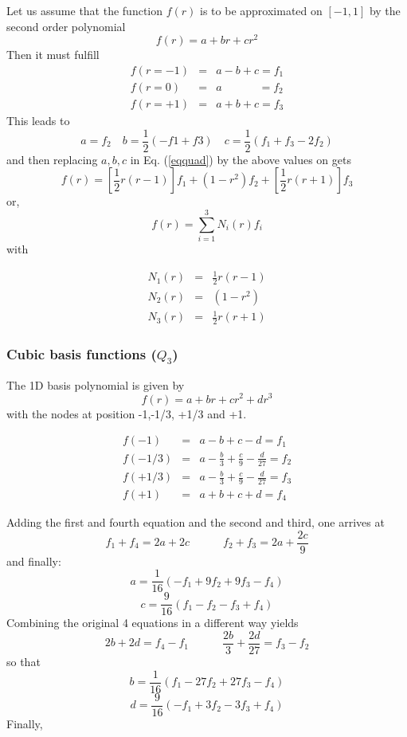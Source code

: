Let us assume that the function $f(r)$ is to be approximated on $[-1,1]$ by the second order polynomial
\begin{equation}
f(r)=a+br+cr^2 \label{eqquad}
\end{equation}
Then it must fulfill
\begin{eqnarray}
f(r=-1)&=&a-b+c = f_1 \nonumber\\
f(r=0) &=&a\quad\quad\quad\;     = f_2 \nonumber\\
f(r=+1)&=&a+b+c = f_3 \nonumber
\end{eqnarray}
This leads to
\[
a=f_2 
\quad
b=\frac{1}{2}(-f1+f3)
\quad
c=\frac{1}{2}(f_1+f_3-2f_2)
\]
and then replacing $a,b,c$ in Eq. (\ref{eqquad}) by the above values on gets
\[
f(r)=\left[\frac{1}{2}r(r-1)\right] f_1 + (1-r^2) f_2 + \left[\frac{1}{2}r(r+1)\right] f_3
\]
or,
\[
f(r) = \sum_{i=1}^3 N_i(r) f_i
\]
with
\begin{mdframed}[backgroundcolor=blue!5]
\begin{eqnarray}
N_1(r) &=& \frac{1}{2}r(r-1) \nonumber\\
N_2(r) &=& (1-r^2) \nonumber\\ 
N_3(r) &=& \frac{1}{2}r(r+1) 
\end{eqnarray}
\end{mdframed}



\subsubsection{Cubic basis functions ($Q_3$)}

The 1D basis polynomial is given by
\[
f(r)=a+br+cr^2+dr^3
\]
with the nodes at position -1,-1/3, +1/3 and +1.

\begin{eqnarray}
f(-1)   &=& a-b+c-d = f_1 \nonumber\\
f(-1/3) &=& a-\frac{b}{3}+\frac{c}{9}-\frac{d}{27} = f_2 \nonumber\\
f(+1/3) &=& a-\frac{b}{3}+\frac{c}{9}-\frac{d}{27} = f_3 \nonumber\\
f(+1)   &=& a+b+c+d = f_4 \nonumber
\end{eqnarray}

Adding the first and fourth equation and the second and third, one arrives at
\[
f_1+f_4 = 2a+2c \quad\quad\quad f_2+f_3=2a+\frac{2c}{9}
\]
and finally:
\[
a=\frac{1}{16} \left( -f_1 + 9f_2 + 9f_3 - f_4  \right)
\]
\[
c=\frac{9}{16}\left(f_1-f_2-f_3+f_4\right)
\]
Combining the original 4 equations in a different way yields
\[
2b+2d=f_4-f_1 
\quad\quad\quad
\frac{2b}{3} + \frac{2d}{27} = f_3-f_2
\]
so that
\[
b=\frac{1}{16} \left( f_1 - 27f_2 + 27f_3 -f_4   \right)
\]
\[
d=\frac{9}{16} \left( -f_1 + 3f_2 - 3f_3 + f_4 \right)
\]
Finally,

